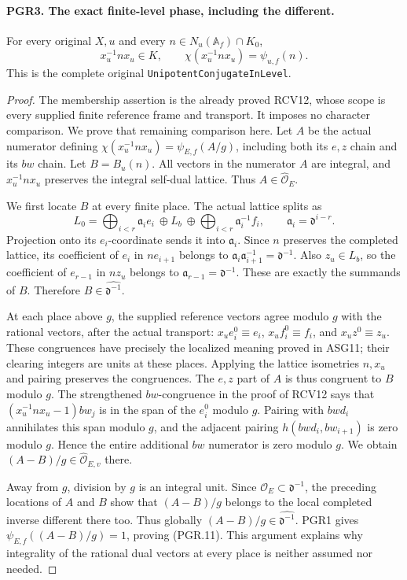 \paragraph{PGR3. The exact finite-level phase, including the different.}
\label{claim:PGR3}
For every original \(X,u\) and every
\(n\in N_u(\mathbb A_f)\cap K_0\),
\[
 x_u^{-1}nx_u\in K,\qquad
             \chi(x_u^{-1}nx_u)=\psi_{u,f}(n).
\tag{PGR.11}
\]
This is the complete original \texttt{UnipotentConjugateInLevel}.
\begin{proof}
The membership assertion is the already proved RCV12, whose scope is
every supplied finite reference frame and transport.  It imposes no
character comparison.  We prove that remaining comparison here.
Let \(A\) be the actual numerator defining
\(\chi(x_u^{-1}nx_u)=\psi_{E,f}(A/g)\), including both its
\(e,z\) chain and its \(bw\) chain.  Let \(B=B_u(n)\).
All vectors in the numerator \(A\) are integral, and
\(x_u^{-1}nx_u\) preserves the integral self-dual lattice.
Thus \(A\in\widehat{\mathcal O}_E\).

We first locate \(B\) at every finite place.  The actual lattice
splits as
\[
 L_0=\bigoplus_{i<r}\mathfrak a_i e_i\ \oplus L_b\ \oplus
               \bigoplus_{i<r}\mathfrak a_i^{-1} f_i,
             \qquad \mathfrak a_i=\mathfrak d^{i-r}.
\tag{PGR.12}
\]
Projection onto its \(e_i\)-coordinate sends it into
\(\mathfrak a_i\).  Since \(n\) preserves the completed
lattice, its coefficient of \(e_i\) in \(ne_{i+1}\) belongs
to \(\mathfrak a_i\mathfrak a_{i+1}^{-1}=\mathfrak d^{-1}\).
Also \(z_u\in L_b\), so the coefficient of \(e_{r-1}\)
in \(nz_u\) belongs to \(\mathfrak a_{r-1}=\mathfrak d^{-1}\).
These are exactly the summands of \(B\).  Therefore
\(B\in\widehat{\mathfrak d^{-1}}\).

At each place above \(g\), the supplied reference vectors agree
modulo \(g\) with the rational vectors, after the actual transport:
\(x_ue_i^0\equiv e_i\), \(x_uf_i^0\equiv f_i\), and
\(x_uz^0\equiv z_u\).  These congruences have precisely the
localized meaning proved in ASG11; their clearing integers are units
at these places.  Applying the lattice isometries \(n,x_u\) and
pairing preserves the congruences.  The \(e,z\) part of \(A\)
is thus congruent to \(B\) modulo \(g\).  The strengthened
\(bw\)-congruence in the proof of RCV12 says that
\((x_u^{-1}nx_u-1)bw_j\) is in the span of the \(e_i^0\)
modulo \(g\).  Pairing with \(bwd_i\) annihilates this span
modulo \(g\), and the adjacent pairing
\(h(bwd_i,bw_{i+1})\) is zero modulo \(g\).  Hence the
entire additional \(bw\) numerator is zero modulo \(g\).
We obtain \((A-B)/g\in\widehat{\mathcal O}_{E,v}\) there.

Away from \(g\), division by \(g\) is an integral unit.
Since \(\mathcal O_E\subset\mathfrak d^{-1}\), the preceding
locations of \(A\) and \(B\) show that \((A-B)/g\) belongs
to the local completed inverse different there too.  Thus globally
\((A-B)/g\in\widehat{\mathfrak d^{-1}}\).  PGR1 gives
\(\psi_{E,f}((A-B)/g)=1\), proving (PGR.11).  This argument
explains why integrality of the rational dual vectors at every place
is neither assumed nor needed.
\end{proof}

